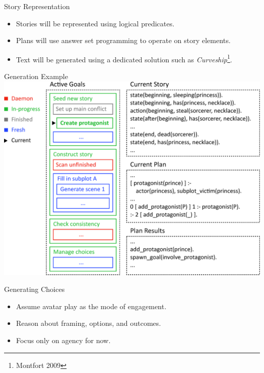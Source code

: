 \documentclass[xcolor=x11names]{beamer}
\newcommand{\work}[1]{\textit{#1}\xspace}
\begin{document}
\begin{frame}{Story Representation}
  \begin{itemize}
    \item Stories will be represented using logical predicates.
    \item Plans will use answer set programming to operate on story elements.
    \item Text will be generated using a dedicated solution such as \work{Curveship}\footnote{Montfort 2009}.
  \end{itemize}
\end{frame}

\begin{frame}{Generation Example}
  \includegraphics[height=0.8\textheight]{res/system_demo.eps}
\end{frame}

\begin{frame}{Generating Choices}
  \begin{itemize}
    \item Assume avatar play as the mode of engagement.
    \item Reason about framing, options, and outcomes.
    \item Focus only on agency for now.
  \end{itemize}
\end{frame}
\end{document}
